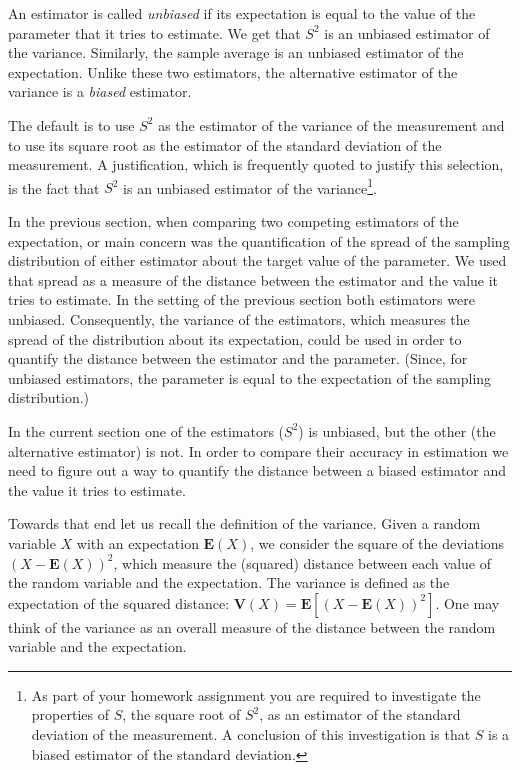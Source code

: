 \documentclass[]{krantz}
\newcommand{\Expec}{\mathbf{E}}
\newcommand{\Var}{\mathbf{V}}
\theoremstyle{definition}
\theoremstyle{definition}
\theoremstyle{definition}
\theoremstyle{remark}
\begin{document}
An estimator is called \emph{unbiased} if its expectation is equal to the
value of the parameter that it tries to estimate. We get that \(S^2\) is
an unbiased estimator of the variance. Similarly, the sample average is
an unbiased estimator of the expectation. Unlike these two estimators,
the alternative estimator of the variance is a \emph{biased} estimator.

The default is to use \(S^2\) as the estimator of the variance of the
measurement and to use its square root as the estimator of the standard
deviation of the measurement. A justification, which is frequently
quoted to justify this selection, is the fact that \(S^2\) is an unbiased
estimator of the variance\footnote{As part of your homework assignment you are required to
  investigate the properties of \(S\), the square root of \(S^2\), as an
  estimator of the standard deviation of the measurement. A conclusion
  of this investigation is that \(S\) is a biased estimator of the
  standard deviation.}.

In the previous section, when comparing two competing estimators of the
expectation, or main concern was the quantification of the spread of the
sampling distribution of either estimator about the target value of the
parameter. We used that spread as a measure of the distance between the
estimator and the value it tries to estimate. In the setting of the
previous section both estimators were unbiased. Consequently, the
variance of the estimators, which measures the spread of the
distribution about its expectation, could be used in order to quantify
the distance between the estimator and the parameter. (Since, for
unbiased estimators, the parameter is equal to the expectation of the
sampling distribution.)

In the current section one of the estimators (\(S^2\)) is unbiased, but
the other (the alternative estimator) is not. In order to compare their
accuracy in estimation we need to figure out a way to quantify the
distance between a biased estimator and the value it tries to estimate.

Towards that end let us recall the definition of the variance. Given a
random variable \(X\) with an expectation \(\Expec(X)\), we consider the
square of the deviations \((X - \Expec(X))^2\), which measure the
(squared) distance between each value of the random variable and the
expectation. The variance is defined as the expectation of the squared
distance: \(\Var(X) = \Expec[(X-\Expec(X))^2]\). One may think of the
variance as an overall measure of the distance between the random
variable and the expectation.
\end{document}
